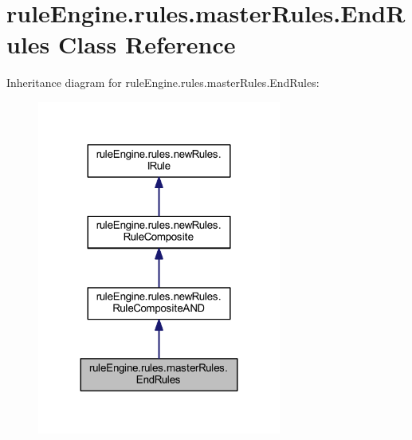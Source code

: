 \hypertarget{classrule_engine_1_1rules_1_1master_rules_1_1_end_rules}{}\section{rule\+Engine.\+rules.\+master\+Rules.\+End\+Rules Class Reference}
\label{classrule_engine_1_1rules_1_1master_rules_1_1_end_rules}


Inheritance diagram for rule\+Engine.\+rules.\+master\+Rules.\+End\+Rules\+:
\nopagebreak
\begin{figure}[H]
\begin{center}
\leavevmode
\includegraphics[width=227pt]{classrule_engine_1_1rules_1_1master_rules_1_1_end_rules__inherit__graph}
\end{center}
\end{figure}


